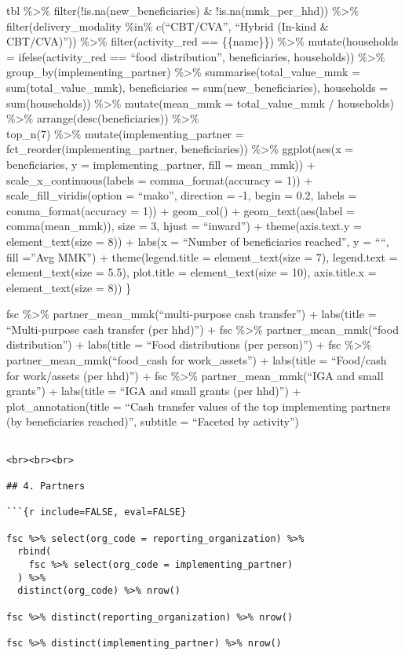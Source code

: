 \documentclass[
]{article}
\begin{document}
tbl \%\textgreater\% filter(!is.na(new\_beneficiaries) \&
!is.na(mmk\_per\_hhd)) \%\textgreater\% filter(delivery\_modality \%in\%
c(``CBT/CVA'', ``Hybrid (In-kind \& CBT/CVA)'')) \%\textgreater\%
filter(activity\_red == \{\{name\}\}) \%\textgreater\% mutate(households
= ifelse(activity\_red == ``food distribution'', beneficiaries,
households)) \%\textgreater\% group\_by(implementing\_partner)
\%\textgreater\% summarise(total\_value\_mmk = sum(total\_value\_mmk),
beneficiaries = sum(new\_beneficiaries), households = sum(households))
\%\textgreater\% mutate(mean\_mmk = total\_value\_mmk / households)
\%\textgreater\% arrange(desc(beneficiaries)) \%\textgreater\%\\
top\_n(7) \%\textgreater\% mutate(implementing\_partner =
fct\_reorder(implementing\_partner, beneficiaries)) \%\textgreater\%
ggplot(aes(x = beneficiaries, y = implementing\_partner, fill =
mean\_mmk)) + scale\_x\_continuous(labels = comma\_format(accuracy = 1))
+ scale\_fill\_viridis(option = ``mako'', direction = -1, begin = 0.2,
labels = comma\_format(accuracy = 1)) + geom\_col() +
geom\_text(aes(label = comma(mean\_mmk)), size = 3, hjust = ``inward'')
+ theme(axis.text.y = element\_text(size = 8)) + labs(x = ``Number of
beneficiaries reached'', y = ````, fill =''Avg MMK'') +
theme(legend.title = element\_text(size = 7), legend.text =
element\_text(size = 5.5), plot.title = element\_text(size = 10),
axis.title.x = element\_text(size = 8)) \}

fsc \%\textgreater\% partner\_mean\_mmk(``multi-purpose cash transfer'')
+ labs(title = ``Multi-purpose cash transfer (per hhd)'') + fsc
\%\textgreater\% partner\_mean\_mmk(``food distribution'') + labs(title
= ``Food distributions (per person)'') + fsc \%\textgreater\%
partner\_mean\_mmk(``food\_cash for work\_assets'') + labs(title =
``Food/cash for work/assets (per hhd)'') + fsc \%\textgreater\%
partner\_mean\_mmk(``IGA and small grants'') + labs(title = ``IGA and
small grants (per hhd)'') + plot\_annotation(title = ``Cash transfer
values of the top implementing partners (by beneficiaries reached)'',
subtitle = ``Faceted by activity'')

\begin{verbatim}

<br><br><br>

## 4. Partners

```{r include=FALSE, eval=FALSE}

fsc %>% select(org_code = reporting_organization) %>% 
  rbind(
    fsc %>% select(org_code = implementing_partner)
  ) %>% 
  distinct(org_code) %>% nrow()

fsc %>% distinct(reporting_organization) %>% nrow()

fsc %>% distinct(implementing_partner) %>% nrow()
\end{verbatim}
\end{document}

